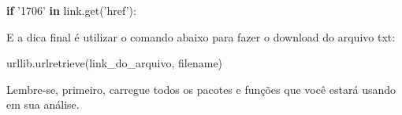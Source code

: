 \documentclass[11pt]{article}
\newenvironment{Shaded}{}{}
\newcommand{\KeywordTok}[1]{\textcolor[rgb]{0.00,0.44,0.13}{\textbf{{#1}}}}
\newcommand{\StringTok}[1]{\textcolor[rgb]{0.25,0.44,0.63}{{#1}}}
\newcommand{\NormalTok}[1]{{#1}}
\newcommand{\ControlFlowTok}[1]{\textcolor[rgb]{0.00,0.44,0.13}{\textbf{{#1}}}}
\begin{document}
\begin{Shaded}
\begin{Highlighting}[]
\ControlFlowTok{if} \StringTok{'1706'} \KeywordTok{in}\NormalTok{ link.get(}\StringTok{'href'}\NormalTok{):}
\end{Highlighting}
\end{Shaded}

E a dica final é utilizar o comando abaixo para fazer o download do
arquivo txt:

\begin{Shaded}
\begin{Highlighting}[]
\NormalTok{urllib.urlretrieve(link_do_arquivo, filename)}
\end{Highlighting}
\end{Shaded}

Lembre-se, primeiro, carregue todos os pacotes e funções que você estará
usando em sua análise.
\end{document}
